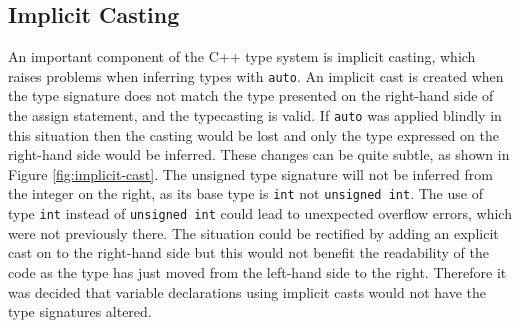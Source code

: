 \documentclass[bsc,frontabs,singlespacing,twoside,parskip,deptreport]{infthesis}
\begin{document}


\subsection{Implicit Casting} \label{sect:con-impl-cast}
An important component of the C++ type system is implicit casting, which raises problems when inferring types with \texttt{auto}. An implicit cast is created when the type signature does not match the type presented on the right-hand side of the assign statement, and the typecasting is valid. If \texttt{auto} was applied blindly in this situation then the casting would be lost and only the type expressed on the right-hand side would be inferred. These changes can be quite subtle, as shown in Figure \ref{fig:implicit-cast}. The unsigned type signature will not be inferred from the integer on the right, as its base type is \texttt{int} not \texttt{unsigned int}. The use of type \texttt{int} instead of \texttt{unsigned int} could lead to unexpected overflow errors, which were not previously there. The situation could be rectified by adding an explicit cast on to the right-hand side but this would not benefit the readability of the code as the type has just moved from the left-hand side to the right. Therefore it was decided that variable declarations using implicit casts would not have the type signatures altered.   
\end{document}
